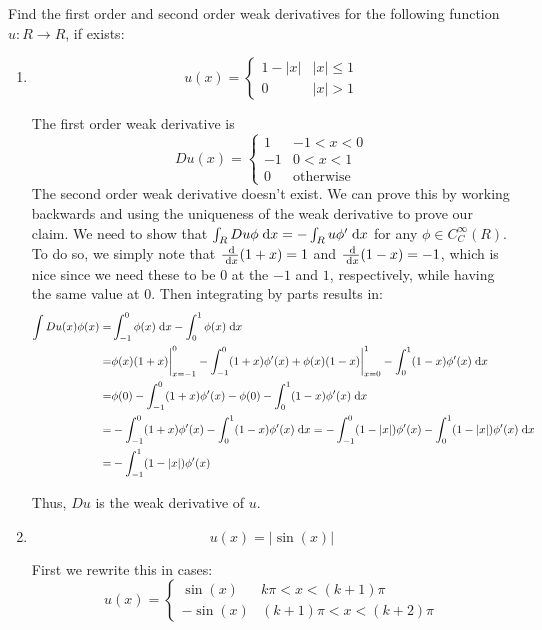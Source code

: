 Find the first order and second order weak derivatives for the following function $u: R \rightarrow R$, if exists:

\begin{enumerate}
\item
  $$
  u(x) =
  \begin{cases}
    1 - |x| & |x| \leq 1\\
    0 & |x| > 1
  \end{cases}
  $$

  The first order weak derivative is
  $$
  Du(x) =
  \begin{cases}
    1 & -1 < x < 0\\
    -1 & 0 < x < 1\\
    0 & \text{otherwise}
  \end{cases}
  $$
  The second order weak derivative doesn't exist.
  We can prove this by working backwards and using the uniqueness of the weak derivative to prove our claim.
  We need to show that $\int_R Du \phi \;\mathrm{d}x = -\int_R u \phi' \;\mathrm{d}x$ for any $\phi \in C_C^\infty(R)$.
  To do so, we simply note that $\frac{\;\mathrm{d}}{\;\mathrm{d}x}(1 + x) = 1$ and $\frac{\;\mathrm{d}}{\;\mathrm{d}x}(1 - x) = -1$,
  which is nice since we need these to be $0$ at the $-1$ and $1$, respectively, while having the same value at $0$.
  Then integrating by parts results in:
  \begin{align*}
    \int Du(x) \phi(x) = &\int_{-1}^0 \phi(x) \;\mathrm{d}x - \int_0^1 \phi(x) \;\mathrm{d}x\\
                       = &\phi(x) (1 + x) \bigg\rvert_{x=-1}^{0} - \int_{-1}^0 (1 + x) \phi'(x)
                          + \phi(x) (1 - x) \bigg\rvert_{x=0}^{1} - \int_0^1 (1 - x) \phi'(x) \;\mathrm{d}x\\
                       = &\phi(0) - \int_{-1}^0 (1 + x) \phi'(x) - \phi(0) - \int_0^1 (1 - x) \phi'(x) \;\mathrm{d}x\\
                       = &-\int_{-1}^0 (1 + x) \phi'(x) - \int_0^1 (1 - x) \phi'(x) \;\mathrm{d}x
                       = -\int_{-1}^0 (1 - |x|) \phi'(x) - \int_0^1 (1 - |x|) \phi'(x) \;\mathrm{d}x\\
                       = &-\int_{-1}^1 (1 - |x|) \phi'(x)
  \end{align*}

  Thus, $Du$ is the weak derivative of $u$.

\item
  $$
  u(x) = |\sin(x)|
  $$

  First we rewrite this in cases:
  $$
  u(x) =
  \begin{cases}
    \sin(x) & k \pi < x < (k + 1) \pi\\
    -\sin(x) & (k + 1) \pi < x < (k + 2) \pi
  \end{cases}
  $$


\end{enumerate}
